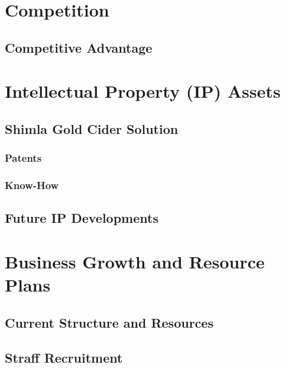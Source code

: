 \documentclass[11pt]{article}
\begin{document}
\section{Competition}
  \subsection{Competitive Advantage}
\section{Intellectual Property (IP) Assets}
  \subsection{Shimla Gold Cider Solution}
    \subsubsection{Patents}
    \subsubsection{Know-How}
  \subsection{Future IP Developments}
\section{Business Growth and Resource Plans}
  \subsection{Current Structure and Resources}
  \subsection{Straff Recruitment}
\end{document}
